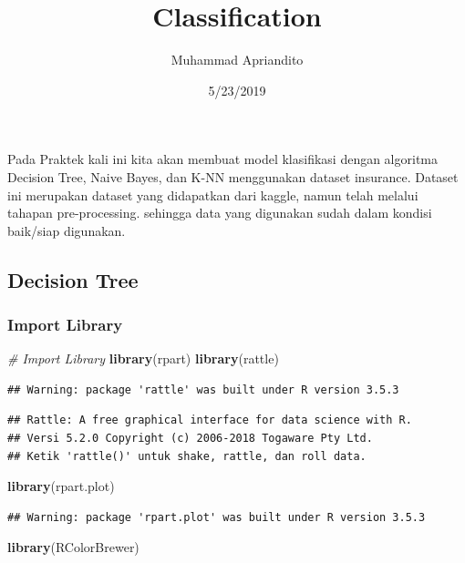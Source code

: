 \documentclass[]{article}
\title{Classification}
\author{Muhammad Apriandito}
\date{5/23/2019}
\newenvironment{Shaded}{\begin{snugshade}}{\end{snugshade}}
\newcommand{\CommentTok}[1]{\textcolor[rgb]{0.56,0.35,0.01}{\textit{#1}}}
\newcommand{\KeywordTok}[1]{\textcolor[rgb]{0.13,0.29,0.53}{\textbf{#1}}}
\newcommand{\NormalTok}[1]{#1}
\begin{document}
\maketitle

Pada Praktek kali ini kita akan membuat model klasifikasi dengan
algoritma Decision Tree, Naive Bayes, dan K-NN menggunakan dataset
insurance. Dataset ini merupakan dataset yang didapatkan dari kaggle,
namun telah melalui tahapan pre-processing. sehingga data yang digunakan
sudah dalam kondisi baik/siap digunakan.

\hypertarget{decision-tree}{%
\subsection{Decision Tree}\label{decision-tree}}

\hypertarget{import-library}{%
\subsubsection{Import Library}\label{import-library}}

\begin{Shaded}
\begin{Highlighting}[]
\CommentTok{# Import Library}
\KeywordTok{library}\NormalTok{(rpart)}
\KeywordTok{library}\NormalTok{(rattle)}
\end{Highlighting}
\end{Shaded}

\begin{verbatim}
## Warning: package 'rattle' was built under R version 3.5.3
\end{verbatim}

\begin{verbatim}
## Rattle: A free graphical interface for data science with R.
## Versi 5.2.0 Copyright (c) 2006-2018 Togaware Pty Ltd.
## Ketik 'rattle()' untuk shake, rattle, dan roll data.
\end{verbatim}

\begin{Shaded}
\begin{Highlighting}[]
\KeywordTok{library}\NormalTok{(rpart.plot)}
\end{Highlighting}
\end{Shaded}

\begin{verbatim}
## Warning: package 'rpart.plot' was built under R version 3.5.3
\end{verbatim}

\begin{Shaded}
\begin{Highlighting}[]
\KeywordTok{library}\NormalTok{(RColorBrewer)}
\end{Highlighting}
\end{Shaded}
\end{document}
